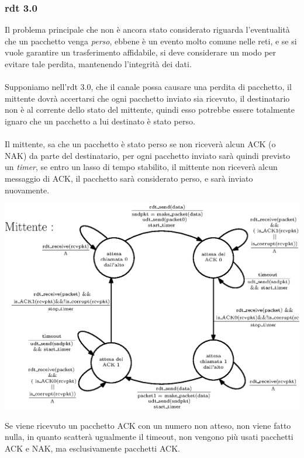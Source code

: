 \documentclass[12pt, letterpaper]{article}
\newcommand{\acc}{\\\hphantom{}\\}
\begin{document}
\subsubsection{rdt 3.0}
Il problema principale che non è ancora stato considerato riguarda l'eventualità che un pacchetto venga
\textit{perso}, ebbene è un evento molto comune nelle reti, e se si vuole garantire un trasferimento affidabile,
si deve considerare un modo per evitare tale perdita, mantenendo l'integrità dei dati.\acc
Supponiamo nell'rdt 3.0, che il canale possa causare una perdita di pacchetto, il mittente dovrà accertarsi che ogni pacchetto
inviato sia ricevuto, il destinatario non è al corrente dello stato del mittente, quindi esso potrebbe essere totalmente
ignaro che un pacchetto a lui destinato è stato perso.\acc
Il mittente, sa che un pacchetto è stato perso se non riceverà alcun ACK (o NAK) da parte del destinatario, per ogni pacchetto
inviato sarà quindi previsto un \textit{timer}, se entro un lasso di tempo stabilito, il mittente non riceverà alcun messaggio
di ACK, il pacchetto sarà considerato perso, e sarà inviato nuovamente.\begin{center}
    \includegraphics[width=1\textwidth ]{images/rdt3.0.eps}
\end{center}
Se viene ricevuto un pacchetto ACK con un numero non atteso, non viene fatto nulla, in quanto scatterà ugualmente
il timeout, non vengono più usati pacchetti ACK e NAK, ma esclusivamente pacchetti ACK.
\end{document}
